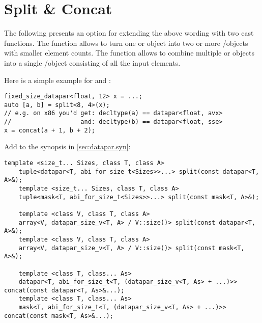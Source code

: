 \section{Split \& Concat}\label{sec:split and concat}
The following presents an option for extending the above wording with two cast functions.
The  function allows to turn one \datapar or \mask object into two or more \datapar/\mask objects with smaller element counts.
The  function allows to combine multiple \datapar or \mask objects into a single \datapar/\mask object consisting of all the input elements.

 Here is a simple example for  and :
 \smallskip
\begin{lstlisting}[style=Vc]
fixed_size_datapar<float, 12> x = ...;
auto [a, b] = split<8, 4>(x);
// e.g. on x86 you'd get: decltype(a) == datapar<float, avx>
//                   and: decltype(b) == datapar<float, sse>
x = concat(a + 1, b + 2);
\end{lstlisting}

Add to the synopsis in \ref{sec:datapar.syn}:
\begin{wgText}
  \begin{lstlisting}[style=Vc]
    template <size_t... Sizes, class T, class A>
    tuple<datapar<T, abi_for_size_t<Sizes>>...> split(const datapar<T, A>&);
    template <size_t... Sizes, class T, class A>
    tuple<mask<T, abi_for_size_t<Sizes>>...> split(const mask<T, A>&);

    template <class V, class T, class A>
    array<V, datapar_size_v<T, A> / V::size()> split(const datapar<T, A>&);
    template <class V, class T, class A>
    array<V, datapar_size_v<T, A> / V::size()> split(const mask<T, A>&);

    template <class T, class... As>
    datapar<T, abi_for_size_t<T, (datapar_size_v<T, As> + ...)>> concat(const datapar<T, As>&...);
    template <class T, class... As>
    mask<T, abi_for_size_t<T, (datapar_size_v<T, As> + ...)>> concat(const mask<T, As>&...);
  \end{lstlisting}
\end{wgText}

